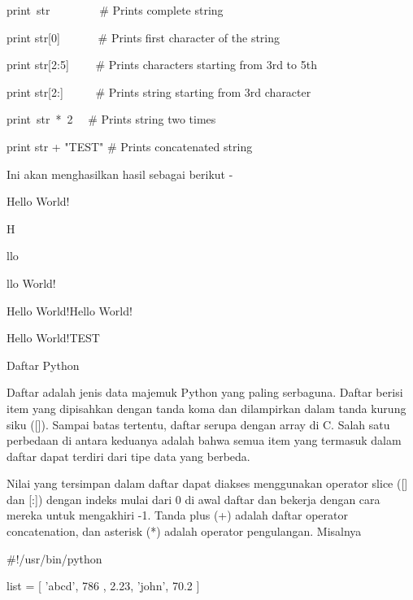 \vspace{12pt}
\noindent 
print~str~~~~~~~~   $  \#  $ Prints complete string \par
\noindent 
print str[0]~~~~~~  $  \#  $ Prints first character of the string \par
\noindent 
print str[2:5]~~~~  $  \#  $ Prints characters starting from 3rd to 5th \par
\noindent 
print str[2:]~~~~~  $  \#  $ Prints string starting from 3rd character \par
\noindent 
print~str~*~2~~     $  \#  $ Prints string two times \par
\noindent 
print str + "TEST"  $  \#  $ Prints concatenated string \par
\vspace{12pt}
\noindent 
Ini akan menghasilkan hasil sebagai berikut - \par
\vspace{12pt}
\noindent 
Hello World! \par
\noindent 
H \par
\noindent 
llo \par
\noindent 
llo World! \par
\noindent 
Hello World!Hello World! \par
\noindent 
Hello World!TEST \par
\vspace{12pt}
\noindent 
Daftar Python \par
\vspace{12pt}
\noindent 
Daftar adalah jenis data majemuk Python yang paling serbaguna. $  $Daftar berisi item yang dipisahkan dengan tanda koma dan dilampirkan dalam tanda kurung siku ([]). $  $Sampai batas tertentu, daftar serupa dengan array di C. Salah satu perbedaan di antara keduanya adalah bahwa semua item yang termasuk dalam daftar dapat terdiri dari tipe data yang berbeda. \par
\vspace{12pt}
\noindent 
Nilai yang tersimpan dalam daftar dapat diakses menggunakan operator slice ([] dan [:]) dengan indeks mulai dari 0 di awal daftar dan bekerja dengan cara mereka untuk mengakhiri -1. $  $Tanda plus (+) adalah daftar operator concatenation, dan asterisk (*) adalah operator pengulangan. $  $Misalnya  \par
\vspace{12pt}
\noindent 
 $  \#  $!/usr/bin/python \par
\vspace{12pt}
\noindent 
list = [ 'abcd', 786 , 2.23, 'john', 70.2 ] \par

